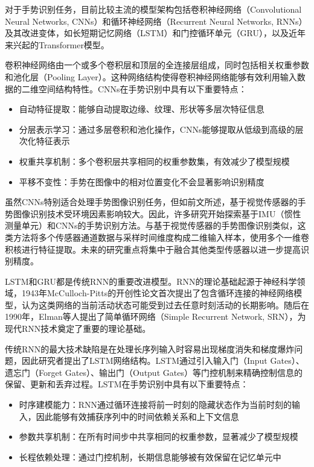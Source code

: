 对于手势识别任务，目前比较主流的模型架构包括卷积神经网络（Convolutional Neural Networks, CNNs）和循环神经网络（Recurrent Neural Networks, RNNs）及其改进变体，如长短期记忆网络（LSTM）和门控循环单元（GRU），以及近年来兴起的Transformer模型。

卷积神经网络由一个或多个卷积层和顶层的全连接层组成，同时包括相关权重参数和池化层（Pooling Layer）。这种网络结构使得卷积神经网络能够有效利用输入数据的二维空间结构特性\cites{wiki:convolutional_neural_network}。CNNs在手势识别中具有以下重要特点\cites{wu2024gesture}：
\begin{itemize}
    \item 自动特征提取：能够自动提取边缘、纹理、形状等多层次特征信息
    \item 分层表示学习：通过多层卷积和池化操作，CNNs能够提取从低级到高级的层次化特征表示
    \item 权重共享机制：多个卷积层共享相同的权重参数集，有效减少了模型规模
    \item 平移不变性：手势在图像中的相对位置变化不会显著影响识别精度
\end{itemize}

虽然CNNs特别适合处理手势图像识别任务，但如前文所述，基于视觉传感器的手势图像识别技术受环境因素影响较大。因此，许多研究开始探索基于IMU（惯性测量单元）和CNNs的手势识别方法\cites{karnerrealtime, dahiya2024efficient,sakuma2022mlp}。与基于视觉传感器的手势图像识别类似，这类方法将多个传感器通道数据与采样时间维度构成二维输入样本，使用多个一维卷积核进行特征提取。未来的研究重点将集中于融合其他类型传感器以进一步提高识别精度\cites{dahiya2024efficient}。

LSTM和GRU都是传统RNN的重要改进模型。RNN的理论基础起源于神经科学领域，1943年McCulloch-Pitts的开创性论文首次提出了包含循环连接的神经网络模型，认为这类网络的当前活动状态可能受到过去任意时刻活动的长期影响。随后在1990年，Elman等人\cites{elman1990finding}提出了简单循环网络（Simple Recurrent Network, SRN），为现代RNN技术奠定了重要的理论基础。

传统RNN的最大技术缺陷是在处理长序列输入时容易出现梯度消失和梯度爆炸问题，因此研究者提出了LSTM网络结构\cites{hochreiter1997long}。LSTM通过引入输入门（Input Gates）、遗忘门（Forget Gates）、输出门（Output Gates）等门控机制来精确控制信息的保留、更新和丢弃过程。LSTM在手势识别中具有以下重要特点\cites{wu2024gesture}：
\begin{itemize}
    \item 时序建模能力：RNN通过循环连接将前一时刻的隐藏状态作为当前时刻的输入，因此能够有效捕获序列中的时间依赖关系和上下文信息
    \item 参数共享机制：在所有时间步中共享相同的权重参数，显著减少了模型规模
    \item 长程依赖处理：通过门控机制，长期信息能够被有效保留在记忆单元中
\end{itemize}

